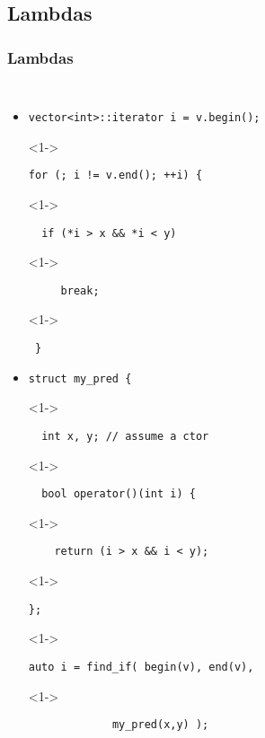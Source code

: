 
\subsection{Lambdas}\lyxframeend{}
\begin{frame}[fragile]
\frametitle{Lambdas}
\begin{columns}[t]
\begin{itemize}
\item  <1->{\scriptsize\begin{verbatim}vector<int>::iterator i = v.begin();  \end{verbatim}}
\item[]<1->{\scriptsize\begin{verbatim}for (; i != v.end(); ++i) {\end{verbatim}}
\item[]<1->{\scriptsize\begin{verbatim}  if (*i > x && *i < y)    \end{verbatim}}
\item[]<1->{\scriptsize\begin{verbatim}     break;  \end{verbatim}}
\item[]<1->{\scriptsize\begin{verbatim} }   \end{verbatim}}
\vskip 6pt
\item  <1->{\scriptsize\begin{verbatim}struct my_pred {  \end{verbatim}}
\item[]<1->{\scriptsize\begin{verbatim}  int x, y; // assume a ctor\end{verbatim}}
\item[]<1->{\scriptsize\begin{verbatim}  bool operator()(int i) {   \end{verbatim}}
\item[]<1->{\scriptsize\begin{verbatim}    return (i > x && i < y); \end{verbatim}}
\item[]<1->{\scriptsize\begin{verbatim}}; \end{verbatim}}
\vskip 6pt
\item[]<1->{\scriptsize\begin{verbatim}auto i = find_if( begin(v), end(v), \end{verbatim}}
\item[]<1->{\scriptsize\begin{verbatim}             my_pred(x,y) );     \end{verbatim}}
\end{itemize}


\end{columns}
\end{frame}
